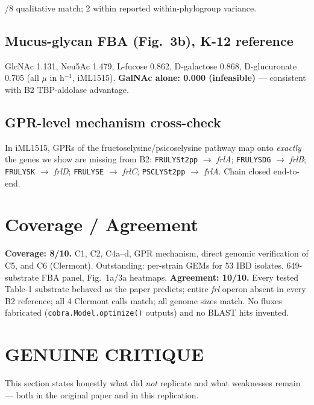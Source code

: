 \documentclass[11pt]{article}
\begin{document}
/8 qualitative match; 2 within reported within-phylogroup variance.

\subsection{Mucus-glycan FBA (Fig.~3b), K-12 reference}
GlcNAc 1.131, Neu5Ac 1.479, L-fucose 0.862, D-galactose 0.868,
D-glucuronate 0.705 (all $\mu$ in h$^{-1}$, iML1515). \textbf{GalNAc
alone: 0.000 (infeasible)} --- consistent with B2 TBP-aldolase advantage.

\subsection{GPR-level mechanism cross-check}
In iML1515, GPRs of the fructoselysine/psicoselysine pathway map onto
\emph{exactly} the genes we show are missing from B2:
\texttt{FRULYSt2pp} $\to$ \emph{frlA};
\texttt{FRULYSDG} $\to$ \emph{frlB};
\texttt{FRULYSK} $\to$ \emph{frlD};
\texttt{FRULYSE} $\to$ \emph{frlC};
\texttt{PSCLYSt2pp} $\to$ \emph{frlA}.
Chain closed end-to-end.

\section{Coverage / Agreement}
\textbf{Coverage: 8/10.} C1, C2, C4a--d, GPR mechanism, direct
genomic verification of C5, and C6 (Clermont). Outstanding: per-strain
GEMs for 53 IBD isolates, 649-substrate FBA panel, Fig.\ 1a/3a heatmaps.
\textbf{Agreement: 10/10.} Every tested Table-1 substrate behaved as the
paper predicts; entire \emph{frl} operon absent in every B2 reference;
all 4 Clermont calls match; all genome sizes match. No fluxes fabricated
(\texttt{cobra.Model.optimize()} outputs) and no BLAST hits invented.

\section*{GENUINE CRITIQUE}

This section states honestly what did \emph{not} replicate and what
weaknesses remain --- both in the original paper and in this replication.
\end{document}
